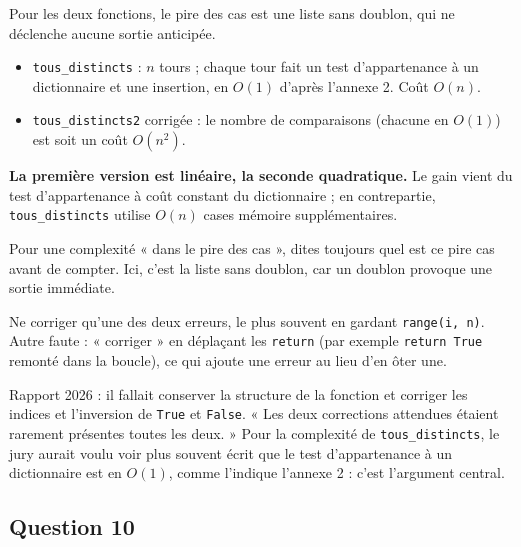 \documentclass[11pt,a4paper]{article}
\providecommand{\tightlist}{\setlength{\itemsep}{0pt}\setlength{\parskip}{0pt}}
\newcommand{\equationajustee}[1]{%
  \sbox{\boiteequation}{$\displaystyle #1$}%
  \ifdim\wd\boiteequation>\linewidth
    \[\resizebox{\linewidth}{!}{\usebox{\boiteequation}}\]%
  \else
    \[#1\]%
  \fi}
\begin{document}
Pour les deux fonctions, le pire des cas est une liste sans doublon, qui ne déclenche aucune sortie anticipée.

\begin{itemize}
\tightlist
\item
  \texttt{tous\_distincts} : \(n\) tours ; chaque tour fait un test d'appartenance à un dictionnaire et une insertion, en \(O(1)\) d'après l'annexe 2. Coût \textbf{\(O(n)\)}.
\item
  \texttt{tous\_distincts2} corrigée : le nombre de comparaisons (chacune en \(O(1)\)) est
  \equationajustee{\sum_{i=0}^{n-1} (n-1-i) = \frac{n(n-1)}{2},}
  soit un coût \textbf{\(O(n^2)\)}.
\end{itemize}

\textbf{La première version est linéaire, la seconde quadratique.} Le gain vient du test d'appartenance à coût constant du dictionnaire ; en contrepartie, \texttt{tous\_distincts} utilise \(O(n)\) cases mémoire supplémentaires.

\begin{methode}

Pour une complexité « dans le pire des cas », dites toujours quel est ce pire cas avant de compter. Ici, c'est la liste sans doublon, car un doublon provoque une sortie immédiate.

\end{methode}

\begin{piege}

Ne corriger qu'une des deux erreurs, le plus souvent en gardant \texttt{range(i,\ n)}. Autre faute : « corriger » en déplaçant les \texttt{return} (par exemple \texttt{return\ True} remonté dans la boucle), ce qui ajoute une erreur au lieu d'en ôter une.

\end{piege}

\begin{jury}

Rapport 2026 : il fallait conserver la structure de la fonction et corriger les indices et l'inversion de \texttt{True} et \texttt{False}. « Les deux corrections attendues étaient rarement présentes toutes les deux. » Pour la complexité de \texttt{tous\_distincts}, le jury aurait voulu voir plus souvent écrit que le test d'appartenance à un dictionnaire est en \(O(1)\), comme l'indique l'annexe 2 : c'est l'argument central.

\end{jury}

\hypertarget{question-10}{%
\subsection{Question 10}\label{question-10}}
\end{document}
